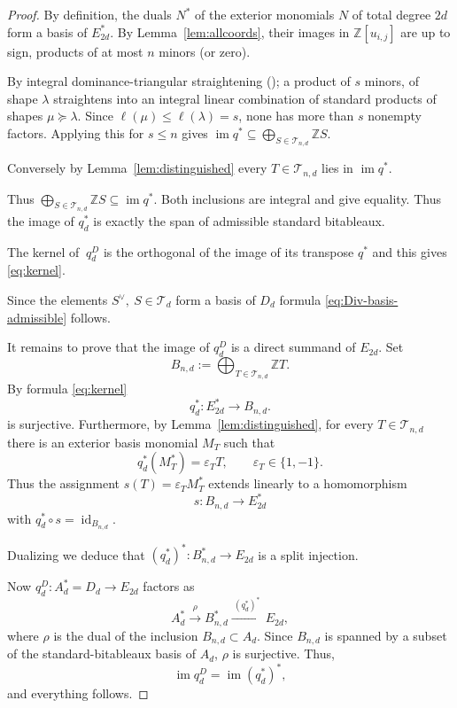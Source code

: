 \documentclass[10pt]{amsart}
\theoremstyle{definition}
\theoremstyle{remark}
\newcommand{\Z}{\mathbb Z}
\begin{document}
\begin{proof} By definition, the duals \(N^*\) of the exterior monomials \(N\) of total degree \(2d\) form a basis of \(E_{2d}^*\). By Lemma~\ref{lem:allcoords}, their images in $\Z[ u_{i,j}]$  are up to sign,  products of at most $n$ minors (or zero).
\smallskip 
 
 By integral dominance-triangular straightening
(\cite[Proposition~8.24 and Theorem~8.25]{depr0});  
a product of $s$ minors, of shape
$\lambda$ straightens into an integral linear combination of
standard products of shapes $\mu \succeq\lambda$. Since
$\ell(\mu)\le\ell(\lambda)=s$, none has more than $s$
nonempty factors. Applying this for $s\le n$ gives
$\operatorname{im}q^*\subseteq \bigoplus_{S\in  \mathcal T_{n,d}}\mathbb Z S$. \smallskip
 
 Conversely by Lemma~\ref{lem:distinguished} every $T\in\mathcal T_{n,d}$ lies in  $\operatorname{im}q^*$. 
 
 Thus $\bigoplus_{S\in  \mathcal T_{n,d}}\mathbb Z S\subseteq\operatorname{im}q^*$. 
 Both inclusions are integral and give equality.
 Thus the  image of 
$q_d^*$ is exactly the span of admissible standard bitableaux.\smallskip

The kernel of $\ q_d^D$  is the orthogonal of  the image  of its transpose $q^*$ and this gives
\eqref{eq:kernel}.\smallskip

Since the elements $S^\vee,\ S\in \mathcal T_d$ form a basis  of  $D_d$  formula \eqref{eq:Div-basis-admissible} follows.\medskip



It remains to prove that the image of $q_d^D$ is a direct
summand of $E_{2d}$. Set
\[
B_{n,d}:=\bigoplus_{T\in\mathcal{T}_{n,d}}\mathbb{Z}T.
\]
By formula \eqref{eq:kernel}
\[
q_d^*:E_{2d}^*\longrightarrow B_{n,d}.
\]
is surjective.
Furthermore, by Lemma~\ref{lem:distinguished}, for every $T\in\mathcal{T}_{n,d}$ there is
an exterior basis monomial $M_T$ such that
\[
q_d^*(M_T^*)=\varepsilon_T T,
\qquad \varepsilon_T\in\{1,-1\}.
\]
Thus the assignment $s(T)=\varepsilon_T M_T^*$ extends
linearly to a homomorphism
\[
s:B_{n,d}\longrightarrow E_{2d}^*
\]
with $q_d^*\circ s=\operatorname{id}_{B_{n,d}}$.\smallskip

Dualizing  we deduce that 
$(q_d^*)^*:B_{n,d}^*\longrightarrow E_{2d}$
is a split injection.

Now  $q_d^D:A_d^*=D_d\longrightarrow E_{2d}$
factors as
\[
A_d^*\xrightarrow{\ \rho\ }B_{n,d}^*
\xrightarrow{\ (q_d^*)^*\ }E_{2d},
\]
where $\rho$ is the dual of the inclusion
 $B_{n,d}\subset A_d$. Since  $B_{n,d}$ is spanned by a subset of the
standard-bitableaux basis of $A_d$,  $\rho$ is surjective. Thus,
\[
\operatorname{im}q_d^D=\operatorname{im}(q_d^*)^*,
\]
and everything follows.

 \end{proof}
\end{document}
